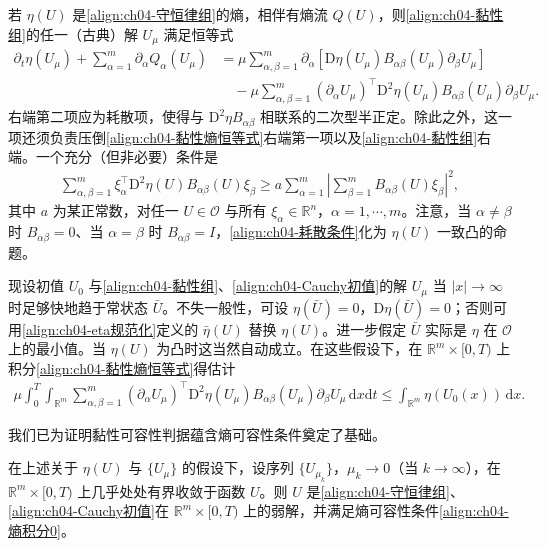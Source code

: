 \documentclass[../../main.tex]{subfiles}
\begin{document}
若 $\eta(U)$ 是\eqref{align:ch04-守恒律组}的熵，相伴有熵流 $Q(U)$，则\eqref{align:ch04-黏性组}的任一（古典）解 $U_{\mu}$ 满足恒等式
\begin{align}
\partial_{t}\eta(U_{\mu})+\sum_{\alpha=1}^{m}\partial_{\alpha}Q_{\alpha}(U_{\mu})&=\mu\sum_{\alpha,\beta=1}^{m}\partial_{\alpha}[\mathrm{D}\eta(U_{\mu})B_{\alpha\beta}(U_{\mu})\partial_{\beta}U_{\mu}]\nonumber\\
&\quad-\mu\sum_{\alpha,\beta=1}^{m}(\partial_{\alpha}U_{\mu})^{\top}\mathrm{D}^{2}\eta(U_{\mu})B_{\alpha\beta}(U_{\mu})\partial_{\beta}U_{\mu}.
\label{align:ch04-黏性熵恒等式}
\end{align}
右端第二项应为耗散项，使得与 $\mathrm{D}^{2}\eta B_{\alpha\beta}$ 相联系的二次型半正定。除此之外，这一项还须负责压倒\eqref{align:ch04-黏性熵恒等式}右端第一项以及\eqref{align:ch04-黏性组}右端。一个充分（但非必要）条件是
\begin{align}
\sum_{\alpha,\beta=1}^{m}\xi_{\alpha}^{\top}\mathrm{D}^{2}\eta(U)B_{\alpha\beta}(U)\xi_{\beta}\geqslant a\sum_{\alpha=1}^{m}\left|\sum_{\beta=1}^{m}B_{\alpha\beta}(U)\xi_{\beta}\right|^{2},
\label{align:ch04-耗散条件}
\end{align}
其中 $a$ 为某正常数，对任一 $U\in\mathcal{O}$ 与所有 $\xi_{\alpha}\in\mathbb{R}^{n}$，$\alpha=1,\cdots,m$。注意，当 $\alpha\neq\beta$ 时 $B_{\alpha\beta}=0$、当 $\alpha=\beta$ 时 $B_{\alpha\beta}=I$，\eqref{align:ch04-耗散条件}化为 $\eta(U)$ 一致凸的命题。

现设初值 $U_{0}$ 与\eqref{align:ch04-黏性组}、\eqref{align:ch04-Cauchy初值}的解 $U_{\mu}$ 当 $|x|\to\infty$ 时足够快地趋于常状态 $\bar{U}$。不失一般性，可设 $\eta(\bar{U})=0$，$\mathrm{D}\eta(\bar{U})=0$；否则可用\eqref{align:ch04-eta规范化}定义的 $\bar{\eta}(U)$ 替换 $\eta(U)$。进一步假定 $\bar{U}$ 实际是 $\eta$ 在 $\mathcal{O}$ 上的最小值。当 $\eta(U)$ 为凸时这当然自动成立。在这些假设下，在 $\mathbb{R}^{m}\times[0,T)$ 上积分\eqref{align:ch04-黏性熵恒等式}得估计
\begin{align}
\mu\int_{0}^{T}\int_{\mathbb{R}^{m}}\sum_{\alpha,\beta=1}^{m}(\partial_{\alpha}U_{\mu})^{\top}\mathrm{D}^{2}\eta(U_{\mu})B_{\alpha\beta}(U_{\mu})\partial_{\beta}U_{\mu}\,\mathrm{d}x\mathrm{d}t\leqslant\int_{\mathbb{R}^{m}}\eta(U_{0}(x))\,\mathrm{d}x.
\label{align:ch04-黏性熵估计}
\end{align}

我们已为证明黏性可容性判据蕴含熵可容性条件奠定了基础。

\begin{theorem}\label{theorem:ch04-黏性极限熵}
在上述关于 $\eta(U)$ 与 $\{U_{\mu}\}$ 的假设下，设序列 $\{U_{\mu_{k}}\}$，$\mu_{k}\to 0$（当 $k\to\infty$），在 $\mathbb{R}^{m}\times[0,T)$ 上几乎处处有界收敛于函数 $U$。则 $U$ 是\eqref{align:ch04-守恒律组}、\eqref{align:ch04-Cauchy初值}在 $\mathbb{R}^{m}\times[0,T)$ 上的弱解，并满足熵可容性条件\eqref{align:ch04-熵积分0}。
\end{theorem}
\end{document}
